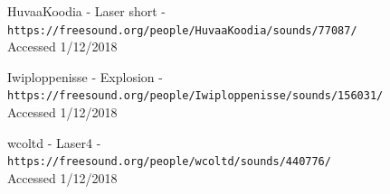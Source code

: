 \documentclass[10pt,a4paper]{article}
\begin{document}
\begin{thebibliography}{9}
HuvaaKoodia - Laser short - \\\texttt{https://freesound.org/people/HuvaaKoodia/sounds/77087/}
\\Accessed 1/12/2018

Iwiploppenisse - Explosion - \\\texttt{https://freesound.org/people/Iwiploppenisse/sounds/156031/}
\\Accessed 1/12/2018

wcoltd - Laser4 - \\\texttt{https://freesound.org/people/wcoltd/sounds/440776/}
\\Accessed 1/12/2018
\end{thebibliography}
\end{document}
